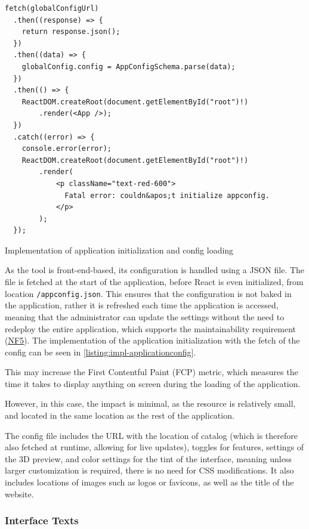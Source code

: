 \begin{listing}[h]
\begin{verbatim}
fetch(globalConfigUrl)
  .then((response) => {
    return response.json();
  })
  .then((data) => {
    globalConfig.config = AppConfigSchema.parse(data);
  })
  .then(() => {
    ReactDOM.createRoot(document.getElementById("root")!)
        .render(<App />);
  })
  .catch((error) => {
    console.error(error);
    ReactDOM.createRoot(document.getElementById("root")!)
        .render(
            <p className="text-red-600">
              Fatal error: couldn&apos;t initialize appconfig.
            </p>
        );
  });
\end{verbatim}
\caption{Implementation of application initialization and config loading}
\label{listing:impl-applicationconfig}
\end{listing}

As the tool is front-end-based, its configuration is handled using a JSON file. The file is fetched at the start of the application, before React is even initialized, from location \texttt{/appconfig.json}. This ensures that the configuration is not baked in the application, rather it is refreshed each time the application is accessed, meaning that the administrator can update the settings without the need to redeploy the entire application, which supports the maintainability requirement (\hyperref[itm:NF5]{NF5}). The implementation of the application initialization with the fetch of the config can be seen in \autoref{listing:impl-applicationconfig}. 

This may increase the First Contentful Paint (FCP) metric, which measures the time it takes to display anything on screen during the loading of the application. \cite{Walton2023}

However, in this case, the impact is minimal, as the resource is relatively small, and located in the same location as the rest of the application.

The config file includes the URL with the location of catalog (which is therefore also fetched at runtime, allowing for live updates), toggles for features, settings of the 3D preview, and color settings for the tint of the interface, meaning unless larger customization is required, there is no need for CSS modifications. It also includes locations of images such as logos or favicons, as well as the title of the website.


\subsubsection{Interface Texts} \label{section:impl-languages}

